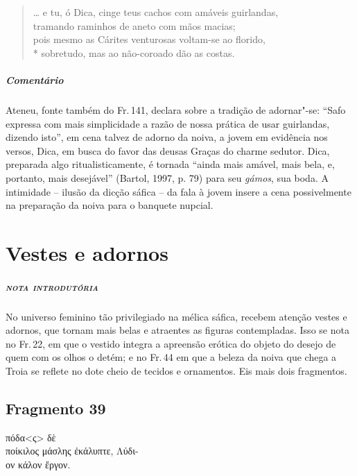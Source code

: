 \begin{verse}
\ldots{} e tu, ó Dica, cinge teus cachos com amáveis guirlandas,\\
tramando raminhos de aneto com mãos macias;\\
pois mesmo as Cárites venturosas voltam-se ao florido,\\*
sobretudo, mas ao não-coroado dão as costas.
\end{verse}

{\paragraph{Comentário} Ateneu, fonte também do Fr.\,141, declara sobre a tradição de adornar"-se:
``Safo expressa com mais simplicidade a razão de nossa prática
de usar guirlandas, dizendo isto”, em cena talvez de adorno da noiva, a jovem em evidência nos versos, Dica, em busca do favor das deusas Graças do charme sedutor.
Dica, preparada algo ritualisticamente, é tornada “ainda mais amável, mais bela, e, portanto, mais desejável” (Bartol, 1997, p. 79) para seu \textit{gámos}, sua boda. A intimidade -- ilusão da dicção sáfica -- da fala à jovem insere a cena possivelmente na preparação da noiva para o banquete nupcial.}


\chapter{Vestes e adornos}

\paragraph{\textsc{nota introdutória}}
No universo feminino tão privilegiado na mélica sáfica, recebem atenção vestes e
adornos, que tornam mais belas e atraentes as figuras contempladas. Isso se
nota no Fr.\,22, em que o vestido integra a apreensão erótica do objeto do
desejo de quem com os olhos o detém; e no Fr.\,44 em que a beleza da noiva que chega a
Troia se reflete no dote cheio de tecidos e ornamentos. Eis mais dois fragmentos.


\section{Fragmento 39}

\begin{gkverse}
πόδα<ς> δὲ\\
ποίκιλος μάσλης ἐκάλυπτε, Λύδι-\\
ον κάλον ἔργον.
\end{gkverse}

